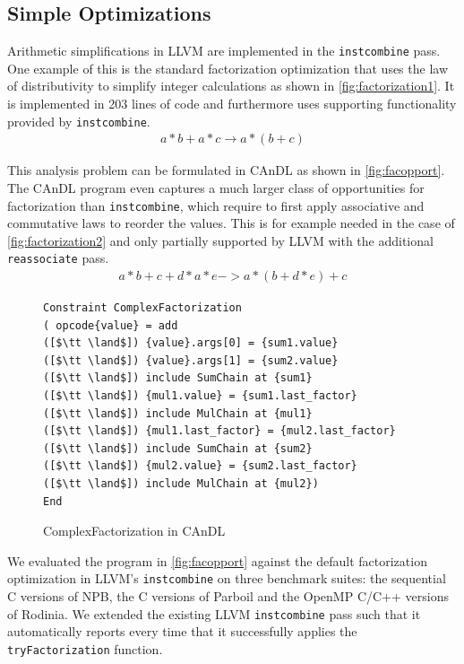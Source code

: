 \subsection{Simple Optimizations}

    Arithmetic simplifications in LLVM are implemented in the
    \texttt{instcombine} pass.
    One example of this is the standard factorization optimization that uses the
    law of distributivity to simplify integer calculations as shown in
    \autoref{fig:factorization1}.
    It is implemented in 203 lines of code and furthermore uses supporting
    functionality provided by \texttt{instcombine}.
    \begin{align}
        a*b+a*c\rightarrow a*(b+c)
        \label{fig:factorization1}
    \end{align}

    This analysis problem can be formulated in CAnDL as shown in
    \autoref{fig:facopport}.
    The CAnDL program even captures a much larger class of opportunities for
    factorization than \texttt{instcombine}, which require to first apply
    associative and commutative laws to reorder the values.
    This is for example needed in the case of \autoref{fig:factorization2} and
    only partially supported by LLVM with the additional \texttt{reassociate}
    pass.
    \begin{align}
        a*b+c+d*a*e->a*(b+d*e)+c
        \label{fig:factorization2}
    \end{align}

\begin{figure}[t]
\begin{lstlisting}[language=CAnDL]
Constraint ComplexFactorization
( opcode{value} = add
([$\tt \land$]) {value}.args[0] = {sum1.value}
([$\tt \land$]) {value}.args[1] = {sum2.value}
([$\tt \land$]) include SumChain at {sum1}
([$\tt \land$]) {mul1.value} = {sum1.last_factor}
([$\tt \land$]) include MulChain at {mul1}
([$\tt \land$]) {mul1.last_factor} = {mul2.last_factor}
([$\tt \land$]) include SumChain at {sum2}
([$\tt \land$]) {mul2.value} = {sum2.last_factor}
([$\tt \land$]) include MulChain at {mul2})
End
\end{lstlisting}
\vspace{-0.3cm}
\caption{ComplexFactorization in CAnDL}
\label{fig:facopport}
\end{figure}

    We evaluated the program in \autoref{fig:facopport} against the default
    factorization optimization in LLVM's \texttt{instcombine} on three benchmark
    suites: the sequential C versions of NPB, the C versions of Parboil and the
    OpenMP C/C++ versions of Rodinia.
    We extended the existing LLVM \texttt{instcombine} pass such that it
    automatically reports every time that it successfully applies the
    \texttt{tryFactorization} function.  

